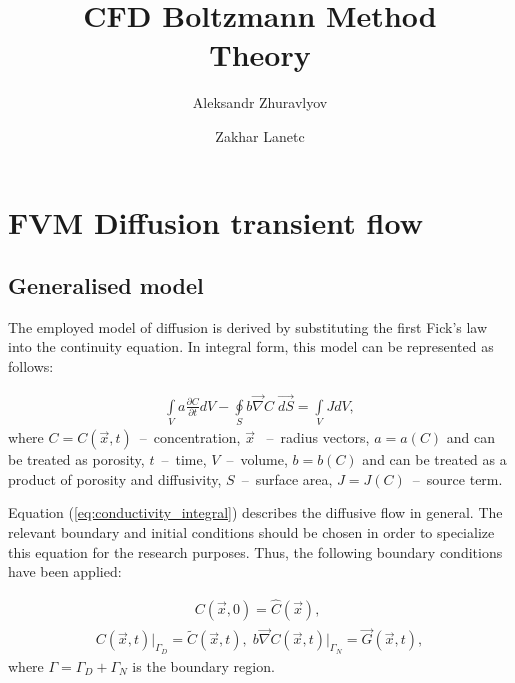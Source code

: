 \documentclass[a4paper,14pt,english]{extreport}
\author{Aleksandr Zhuravlyov \and Zakhar Lanetc}
\title{CFD Boltzmann Method\\Theory}
\date{\DTMnow}
\begin{document}
    \pagecolor{pageColor}
    \color{fontColor}

    \section*{FVM Diffusion transient flow}
    \subsection*{Generalised model}
    
The employed model of diffusion is derived by substituting the first Fick's law into the continuity equation. In integral form, this model can be represented as follows:

    \begin{eqnarray}
        \label{eq:conductivity_integral}
        \int \limits_{V} a \frac{\partial C}{\partial t} d V - \oint \limits_{S} b \vec{\nabla}C \; \vec{dS} = \int \limits_{V} JdV,
    \end{eqnarray}
    where $C = C\left(\vec{x}, t\right)$~--~concentration, $\vec{x}$ ~--~radius vectors, $a = a\left(C\right)$ and can be treated as porosity, $t$~--~time, $V$~--~volume, $b = b\left(C\right)$ and can be treated as a product of porosity and diffusivity, $S$~--~surface area, $J=J\left(C\right)$~--~source term.
    
Equation (\ref{eq:conductivity_integral}) describes the diffusive flow in general. The relevant boundary and initial conditions should be chosen in order to specialize this equation for the research purposes. Thus, the following boundary conditions have been applied:
    
    \begin{eqnarray}
        \label{eq:conductivity_init}
        C\left(\vec{x}, \mathit{0}\right) = \hat{C}\left(\vec{x}\right), \; 
     \end{eqnarray}
    \begin{eqnarray}
      \label{eq:conductivity_bound}
       C\left(\vec{x}, t\right)\Big|_{\mathit{\Gamma}_D} \!\!= \tilde{C}\left(\vec{x}, t\right), \; b \vec{\nabla}C \left(\vec{x}, t\right)\Big|_{\mathit{\Gamma}_N} \!\!= \vec{G}\left(\vec{x}, t\right),
    \end{eqnarray}
where $\mathit{\Gamma} = \mathit{\Gamma_D} + \mathit{\Gamma_N}$ is the boundary region.
\end{document}

